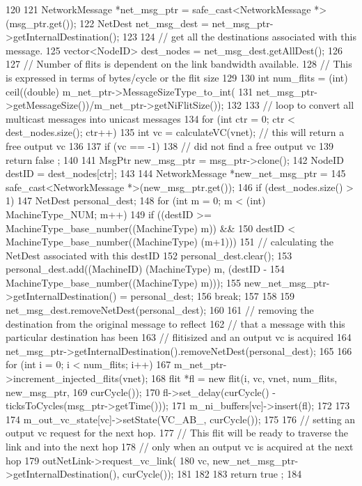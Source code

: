 \begin{DoxyCode}
120 {
121     NetworkMessage *net_msg_ptr = safe_cast<NetworkMessage *>(msg_ptr.get());
122     NetDest net_msg_dest = net_msg_ptr->getInternalDestination();
123 
124     // get all the destinations associated with this message.
125     vector<NodeID> dest_nodes = net_msg_dest.getAllDest();
126 
127     // Number of flits is dependent on the link bandwidth available.
128     // This is expressed in terms of bytes/cycle or the flit size
129 
130     int num_flits = (int) ceil((double) m_net_ptr->MessageSizeType_to_int(
131                 net_msg_ptr->getMessageSize())/m_net_ptr->getNiFlitSize());
132 
133     // loop to convert all multicast messages into unicast messages
134     for (int ctr = 0; ctr < dest_nodes.size(); ctr++) {
135         int vc = calculateVC(vnet); // this will return a free output vc
136 
137         if (vc == -1) {
138             // did not find a free output vc
139             return false ;
140         }
141         MsgPtr new_msg_ptr = msg_ptr->clone();
142         NodeID destID = dest_nodes[ctr];
143 
144         NetworkMessage *new_net_msg_ptr =
145             safe_cast<NetworkMessage *>(new_msg_ptr.get());
146         if (dest_nodes.size() > 1) {
147             NetDest personal_dest;
148             for (int m = 0; m < (int) MachineType_NUM; m++) {
149                 if ((destID >= MachineType_base_number((MachineType) m)) &&
150                     destID < MachineType_base_number((MachineType) (m+1))) {
151                     // calculating the NetDest associated with this destID
152                     personal_dest.clear();
153                     personal_dest.add((MachineID) {(MachineType) m, (destID -
154                         MachineType_base_number((MachineType) m))});
155                     new_net_msg_ptr->getInternalDestination() = personal_dest;
156                     break;
157                 }
158             }
159             net_msg_dest.removeNetDest(personal_dest);
160 
161             // removing the destination from the original message to reflect
162             // that a message with this particular destination has been
163             // flitisized and an output vc is acquired
164             net_msg_ptr->getInternalDestination().removeNetDest(personal_dest);
165         }
166         for (int i = 0; i < num_flits; i++) {
167             m_net_ptr->increment_injected_flits(vnet);
168             flit *fl = new flit(i, vc, vnet, num_flits, new_msg_ptr,
169                                 curCycle());
170             fl->set_delay(curCycle() - ticksToCycles(msg_ptr->getTime()));
171             m_ni_buffers[vc]->insert(fl);
172         }
173 
174         m_out_vc_state[vc]->setState(VC_AB_, curCycle());
175 
176         // setting an output vc request for the next hop.
177         // This flit will be ready to traverse the link and into the next hop
178         // only when an output vc is acquired at the next hop
179         outNetLink->request_vc_link(
180                 vc, new_net_msg_ptr->getInternalDestination(), curCycle());
181     }
182 
183     return true ;
184 }
\end{DoxyCode}
